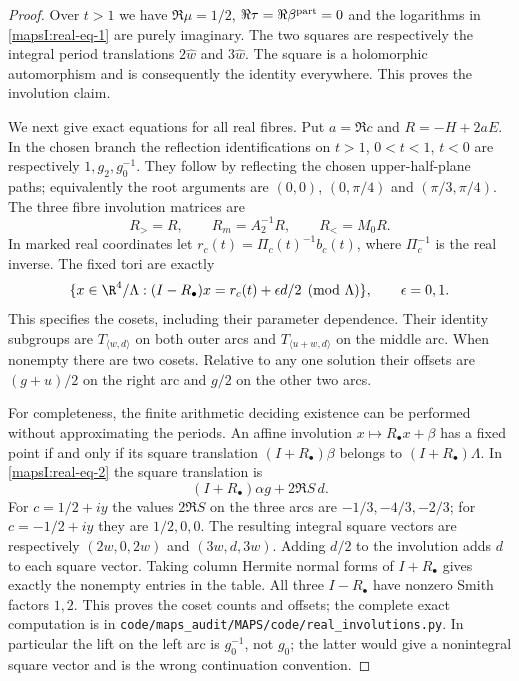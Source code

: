 \begin{proof}
Over $t>1$ we have
$\Re\mu=1/2$, $\Re\tau=\Re\beta^{\rm part}=0$ and the logarithms in
\eqref{mapsI:real-eq-1} are purely imaginary. The two squares are respectively the
integral period translations $2\widehat w$ and $3\widehat w$.
The square is a holomorphic automorphism and is consequently the
identity everywhere. This proves the involution claim.

We next give exact equations for all real fibres. Put $a=\Re c$ and
$R=-H+2aE$. In the chosen branch the reflection identifications on
$t>1$, $0<t<1$, $t<0$ are respectively $1,g_2,g_0^{-1}$.
They follow by reflecting the chosen upper-half-plane paths; equivalently
the root arguments are $(0,0)$, $(0,\pi/4)$ and $(\pi/3,\pi/4)$.
The three fibre involution matrices are
\[
 R_>=R,\qquad R_m=A_2^{-1}R,\qquad R_<=M_0R.
 \label{mapsI:real-eq-5}
\]
In marked real coordinates let $r_c(t)=\Pi_c(t)^{-1}b_c(t)$,
where $\Pi_c^{-1}$ is the real inverse. The fixed tori are exactly
\[
 \{x\in\R^4/\Lambda:(I-R_\bullet)x=
                       r_c(t)+\epsilon d/2\pmod\Lambda\},
 \qquad\epsilon=0,1.
 \label{mapsI:real-eq-6}
\]
This specifies the cosets, including their parameter dependence. Their
identity subgroups are $T_{\langle w,d\rangle}$ on both outer arcs and
$T_{\langle u+w,d\rangle}$ on the middle arc. When nonempty there are
two cosets. Relative to any one solution their offsets are
$(g+u)/2$ on the right arc and $g/2$ on the other two arcs.

For completeness, the finite arithmetic deciding existence can be
performed without approximating the periods. An affine involution
$x\mapsto R_\bullet x+\beta$ has a fixed point if and only if its
square translation $(I+R_\bullet)\beta$ belongs to
$(I+R_\bullet)\Lambda$. In \eqref{mapsI:real-eq-2} the square translation is
\[
 (I+R_\bullet)\alpha g+2\Re S\,d.
\]
For $c=1/2+iy$ the values $2\Re S$ on the three arcs are
$-1/3,-4/3,-2/3$; for $c=-1/2+iy$ they are $1/2,0,0$.
The resulting integral square vectors are respectively
$(2w,0,2w)$ and $(3w,d,3w)$. Adding $d/2$ to the involution adds $d$
to each square vector. Taking column Hermite normal forms of
$I+R_\bullet$ gives exactly the nonempty entries in the table.
All three $I-R_\bullet$ have nonzero Smith factors $1,2$.
This proves the coset counts and offsets; the complete exact computation
is in \texttt{code/maps\_audit/MAPS/code/real\_involutions.py}. In particular the lift on
the left arc is $g_0^{-1}$, not $g_0$; the latter would give a nonintegral
square vector and is the wrong continuation convention.


\end{proof}
